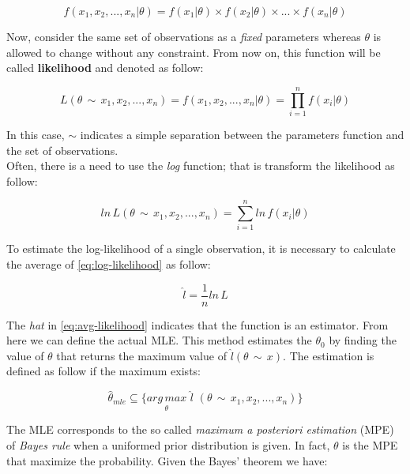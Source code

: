 \begin{equation}
	f (x_{1}, x_{2}, ... , x_{n} | \theta) = f(x_{1} | \theta) \times f(x_{2} | \theta) \times ... \times f(x_{n} | \theta)
\end{equation}

\noindent Now, consider the same set of observations as a \textit{fixed} parameters whereas $\theta$ is allowed to change without any constraint. From now on, this function will be called \textbf{likelihood} and denoted as follow:

\begin{equation}
	L(\theta \, \sim \, x_{1}, x_{2}, ... , x_{n}) = f (x_{1}, x_{2}, ... , x_{n} | \theta) = \prod_{i=1}^{n} f (x_{i} | \theta)
\end{equation}

\noindent In this case, $\sim$ indicates a simple separation between the parameters function and the set of observations. \\
\noindent Often, there is a need to use the \textit{log} function; that is transform the likelihood as follow:

\begin{equation}
\label{eq:log-likelihood}
	ln \, L(\theta \, \sim \, x_{1}, x_{2}, ... , x_{n}) = \sum_{i=1}^{n} ln \, f(x_{i} | \theta)
\end{equation}

\noindent To estimate the log-likelihood of a single observation, it is necessary to calculate the average of \ref{eq:log-likelihood} as follow:

\begin{equation}
\label{eq:avg-likelihood}
	\hat{l} = \frac{1}{n} ln \, L
\end{equation} 

\noindent The \textit{hat} in \ref{eq:avg-likelihood} indicates that the function is an estimator. From here we can define the actual MLE.
This method estimates the $\theta_{0}$ by finding the value of $\theta$ that returns the maximum value of $\hat{l}(\theta \, \sim \, x)$. The estimation is defined as follow if the maximum exists:

\begin{equation}
	\hat{\theta}_{mle} \subseteq \{ \underset{\theta}{arg \, max} \,\, \hat{l} \,\, (\theta \, \sim \, x_{1}, x_{2}, ... , x_{n})\}
\end{equation}

\noindent The MLE corresponds to the so called \textit{maximum a posteriori estimation} (MPE) of \textit{Bayes rule} when a uniformed prior distribution is given. In fact, $\theta$ is the MPE that maximize the probability. Given the Bayes' theorem we have:

